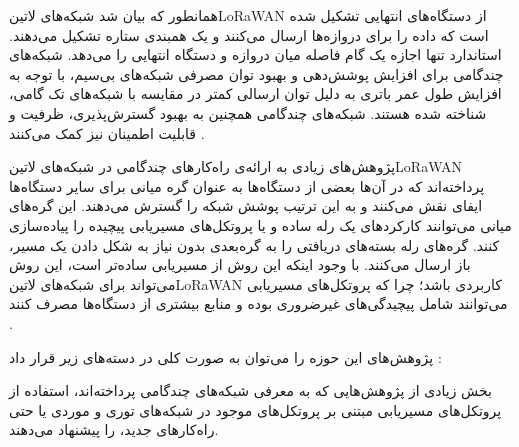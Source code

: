 
همانطور که بیان شد شبکه‌های ‌لاتین{LoRaWAN} از دستگاه‌های انتهایی تشکیل شده است که داده را برای دروازه‌ها ارسال می‌کنند و یک همبندی ستاره تشکیل می‌دهند.
استاندارد تنها اجازه یک گام فاصله میان دروازه و دستگاه انتهایی را می‌دهد.
شبکه‌های چندگامی برای افزایش پوشش‌دهی و بهبود توان مصرفی شبکه‌های بی‌سیم،
با توجه به افزایش طول عمر باتری به دلیل توان ارسالی کمتر در مقایسه با شبکه‌های تک گامی،
شناخته شده هستند.
شبکه‌های چندگامی همچنین به بهبود گسترش‌پذیری، ظرفیت و قابلیت اطمینان نیز کمک می‌کنند
.

پژوهش‌های زیادی به ارائه‌ی راه‌کارهای چندگامی در شبکه‌های ‌لاتین{LoRaWAN} پرداخته‌اند که در آن‌ها بعضی از دستگاه‌ها به عنوان گره میانی برای سایر دستگاه‌ها ایفای نقش می‌کنند و
به این ترتیب پوشش شبکه را گسترش می‌دهند. این گره‌های میانی می‌توانند کارکردهای یک رله ساده و یا پروتکل‌های مسیریابی پیچیده را پیاده‌سازی کنند.
گره‌های رله بسته‌های دریافتی را به گره‌بعدی بدون نیاز به شکل دادن یک مسیر، باز ارسال می‌کنند.
با وجود اینکه این روش از مسیریابی ساده‌تر است، این روش می‌تواند برای شبکه‌های ‌لاتین{LoRaWAN} کاربردی باشد؛ چرا که پروتکل‌های مسیریابی می‌توانند شامل پیچیدگی‌های غیرضروری بوده
و منابع بیشتری از دستگاه‌ها مصرف کنند
.

پژوهش‌های این حوزه را می‌توان به صورت کلی در دسته‌های زیر قرار داد :

 بخش زیادی از پژوهش‌هایی که به معرفی شبکه‌های چندگامی پرداخته‌اند، استفاده از پروتکل‌های مسیریابی مبتنی بر پروتکل‌های موجود در شبکه‌های توری و موردی یا حتی راه‌کارهای جدید، را پیشنهاد می‌دهند.
